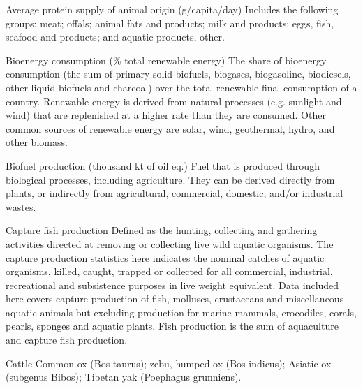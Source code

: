 \begin{MetadataCollection} {}
\begin{metadata}{Average protein supply of animal origin (g/capita/day)} {}
Includes the following groups: meat; offals; animal fats and products; milk and products; eggs, fish, seafood and products; and aquatic products, other. 
\end{metadata}

\begin{metadata}{Bioenergy consumption  (\% total renewable energy)} {}
The share of bioenergy consumption (the sum of primary solid biofuels, biogases, biogasoline, biodiesels, other liquid biofuels and charcoal) over the total renewable final consumption of a country. Renewable energy is derived from natural processes (e.g. sunlight and wind) that are replenished at a higher rate than they are consumed. Other common sources of renewable energy are solar, wind, geothermal, hydro, and other biomass.
\end{metadata}


\begin{metadata}{Biofuel production (thousand kt of oil eq.)} {}
Fuel that is produced through biological processes, including agriculture. They can be derived directly from plants, or indirectly from agricultural, commercial, domestic, and/or industrial wastes.
\end{metadata}

\begin{metadata}{Capture fish production} {}
Defined as the hunting, collecting and gathering activities directed at removing or collecting live wild aquatic organisms. The capture production statistics here indicates the nominal catches of aquatic organisms, killed, caught, trapped or collected for all commercial, industrial, recreational and subsistence purposes in live weight equivalent. Data included here covers capture production of fish, molluscs, crustaceans and miscellaneous aquatic animals but excluding production for marine mammals, crocodiles, corals, pearls, sponges and aquatic plants. Fish production is the sum of aquaculture and capture fish production.
\end{metadata}

\begin{metadata}{Cattle} {}
Common ox (Bos taurus); zebu, humped ox (Bos indicus); Asiatic ox (subgenus Bibos); Tibetan yak (Poephagus grunniens).
\end{metadata}


\end{MetadataCollection}
